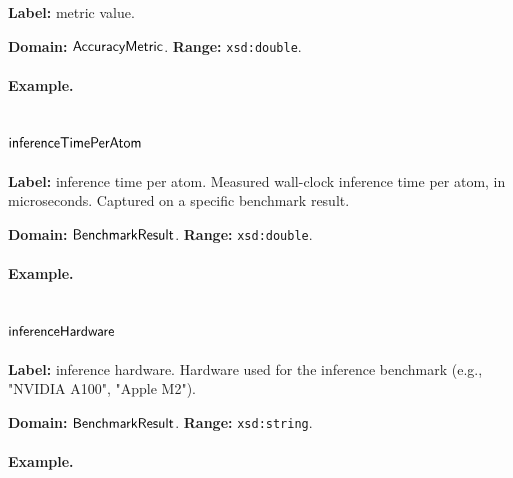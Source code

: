 \textbf{Label:} metric value.

\textbf{Domain:} $\mathsf{AccuracyMetric}$.
\textbf{Range:} \texttt{xsd:double}.

\paragraph{Example.}

\subsection{$\mathsf{inferenceTimePerAtom}$}
\label{sec:term-inferenceTimePerAtom}

\textbf{Label:} inference time per atom.
Measured wall-clock inference time per atom, in microseconds. Captured on a specific benchmark result.

\textbf{Domain:} $\mathsf{BenchmarkResult}$.
\textbf{Range:} \texttt{xsd:double}.

\paragraph{Example.}

\subsection{$\mathsf{inferenceHardware}$}
\label{sec:term-inferenceHardware}

\textbf{Label:} inference hardware.
Hardware used for the inference benchmark (e.g., "NVIDIA A100", "Apple M2").

\textbf{Domain:} $\mathsf{BenchmarkResult}$.
\textbf{Range:} \texttt{xsd:string}.

\paragraph{Example.}

